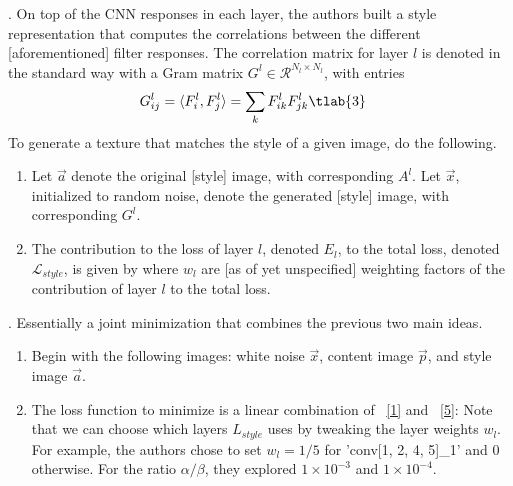 \documentclass[11pt]{article}
\begin{document}
\myspace
\p {}. On top of the CNN responses in each layer, the authors built a style representation that computes the correlations between the different [aforementioned] filter responses. The correlation matrix for layer $l$ is denoted in the standard way with a Gram matrix $G^l \in \mathcal{R}^{N_l \times N_l}$, with entries
\begin{align}
G_{ij}^l &= \langle F^l_i, F_j^l \rangle =  \sum_k F_{ik}^l F_{jk}^l \tlab{3}
\end{align}
To generate a texture that matches the style of a given image, do the following.
\begin{enumerate}
	\item Let $\vec a$ denote the original [style] image, with corresponding $A^l$. Let $\vec x$, initialized to random noise, denote the generated [style] image, with corresponding $G^l$.
	
	\item The contribution to the loss of layer $l$, denoted $E_l$, to the total loss, denoted $\mathcal L_{style}$, is given by
	where $w_l$ are [as of yet unspecified] weighting factors of the contribution of layer $l$ to the total loss. 
\end{enumerate}

\myspace
\p {}. Essentially a joint minimization that combines the previous two main ideas. 
\begin{enumerate}
	\item Begin with the following images: white noise $\vec x$, content image $\vec p$, and style image $\vec a$. 
	
	\item The loss function to minimize is a linear combination of ~\ref{1} and ~\ref{5}:
	Note that we can choose which layers $L_{style}$ uses by tweaking the layer weights $w_l$. For example, the authors chose to set $w_l = 1/5$ for 'conv[1, 2, 4, 5]\_1' and 0 otherwise. For the ratio $\alpha/\beta$, they explored $1 \times 10^{-3}$ and $1 \times 10^{-4}$.
\end{enumerate}
\end{document}
